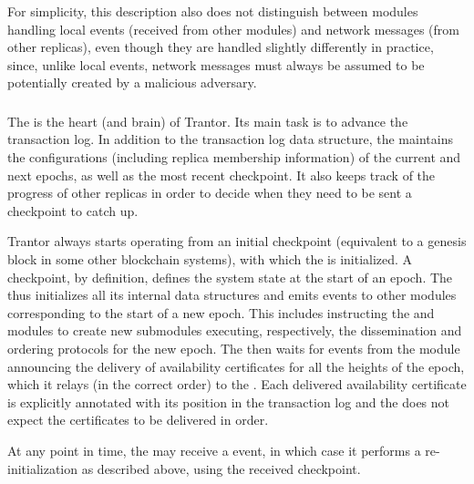 \documentclass{article}
\begin{document}
For simplicity, this description also does not distinguish between modules handling local events (received from other modules)
and network messages (from other replicas), even though they are handled slightly differently in practice,
since, unlike local events, network messages must always be assumed to be potentially created by a malicious adversary.

\subsubsection{}

The  is the heart (and brain) of Trantor.
Its main task is to advance the transaction log.
In addition to the transaction log data structure, the  maintains the configurations
(including replica membership information) of the current and  next epochs,
as well as the most recent checkpoint.
It also keeps track of the progress of other replicas in order to decide when they need to be sent a checkpoint to catch up.

Trantor always starts operating from an initial checkpoint (equivalent to a genesis block in some other blockchain systems),
with which the  is initialized.
A checkpoint, by definition, defines the system state at the start of an epoch.
The  thus initializes all its internal data structures
and emits events to other modules corresponding to the start of a new epoch.
This includes instructing the  and  modules to create new submodules
executing, respectively, the dissemination and ordering protocols for the new epoch.
The  then waits for events from the  module announcing the delivery of availability certificates
for all the heights of the epoch, which it relays (in the correct order) to the .
Each delivered availability certificate is explicitly annotated with its position in the transaction log
and the  does not expect the certificates to be delivered in order.

At any point in time, the  may receive a  event,
in which case it performs a re-initialization as described above, using the received checkpoint.
\end{document}
